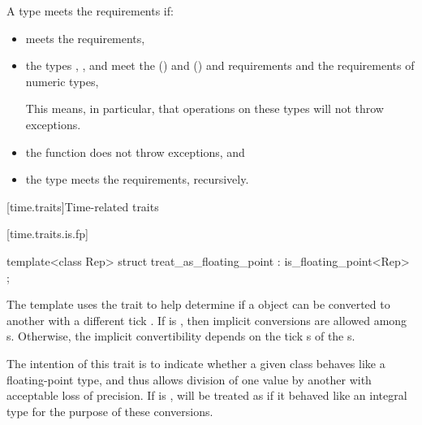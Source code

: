 \pnum
A type  meets the  requirements if:
\begin{itemize}
\item
{} meets the  requirements,

\item
the types , , and 
meet the  () and
 ()
and 
requirements and the requirements of
numeric types,
\begin{note}
This means, in particular,
that operations on these types will not throw exceptions.
\end{note}
\item
the function  does not throw exceptions, and
\item
the type  meets the 
requirements, recursively.
\end{itemize}

[time.traits]{Time-related traits}

[time.traits.is.fp]{}

%
\begin{itemdecl}
template<class Rep> struct treat_as_floating_point : is_floating_point<Rep> { };
\end{itemdecl}

\pnum
The  template uses the  trait to
help determine if a  object can be converted to another
 with a different tick . If
 is , then implicit conversions
are allowed among s. Otherwise, the implicit convertibility
depends on the tick s of the s.
\begin{note}
The intention of this trait is to indicate whether a given class behaves like a floating-point
type, and thus allows division of one value by another with acceptable loss of precision. If
 is ,  will be treated as
if it behaved like an integral type for the purpose of these conversions.
\end{note}

